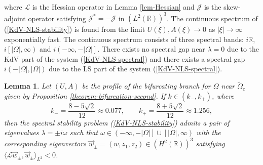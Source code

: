 \documentclass[12pt,reqno]{amsart}
\numberwithin{equation}{section}
\newtheorem{lemma}{Lemma}
\begin{document}
where $\mathcal{L}$ is the Hessian operator in Lemma \ref{lem-Hessian} and $\mathcal{J}$ is the skew-adjoint operator satisfying $\mathcal{J}^* = -\mathcal{J}$ in $(L^2(\mathbb{R}))^3$. The continuous spectrum of (\ref{KdV-NLS-stability}) is found from the limit $U(\xi), A(\xi) \to 0$ as $|\xi| \to \infty$ exponentially fast. The continuous spectrum consists of three spectral bands: $i \mathbb{R}$, $i \left[|\Omega|,\infty \right)$ and $i \left( -\infty, -|\Omega| \right]$. There exists no spectral gap near $\lambda = 0$ due to the KdV part of the system (\ref{KdV-NLS-spectral}) and there exists a spectral gap $i \left( -|\Omega|,|\Omega| \right)$ due to the LS part of the system (\ref{KdV-NLS-spectral}). 

\begin{lemma}
	\label{lem-instability}
	Let $(U,A)$ be the profile of the bifurcating branch for $\Omega$ near $\tilde{\Omega}_c$ given by Proposition \ref{theorem-bifurcation-second}. 
	If $k \in (k_-,k_+)$, where 
\begin{equation}
\label{k-minus-plus}
	k_- = \frac{8-5\sqrt{2}}{12} \approx 0.077, \qquad 
	k_+ = \frac{8+5\sqrt{2}}{12} \approx 1.256,
\end{equation}
	then the spectral stability problem (\ref{KdV-NLS-stability}) 
	admits a pair of eigenvalues $\lambda = \pm i \omega$ 
	such that $\omega \in \left( -\infty, -|\Omega| \right] \cup \left[|\Omega|,\infty \right)$ 
	with the corresponding eigenvectors $\vec{w}_{\pm} = (w,z_1,z_2) \in (H^2(\mathbb{R}))^3$ satisfying 
	$\langle \mathcal{L} \vec{w}_{\pm}, \vec{w}_{\pm} \rangle_{L^2} < 0$.
\end{lemma}
\end{document}
